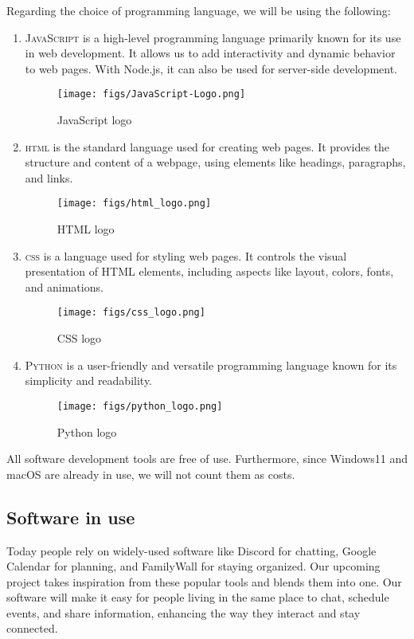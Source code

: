 \documentclass[conference]{IEEEtran}
\begin{document}
\vspace{12pt}
Regarding the choice of programming language, we will be using the following:
\begin{enumerate}
    \item \textsc{JavaScript} is a high-level programming language primarily known for its use in web development. It allows us to add interactivity and dynamic behavior to web pages. With Node.js, it can also be used for server-side development.
    \begin{figure}[H]
    \centering
    \texttt{[image: figs/JavaScript-Logo.png]}
    \caption{JavaScript logo}
    \label{fig:JavaScript logo}
    \end{figure}
    
    \item \textsc{html} is the standard language used for creating web pages. It provides the structure and content of a webpage, using elements like headings, paragraphs, and links.
    \begin{figure}[H]
    \centering
    \texttt{[image: figs/html\_logo.png]}
    \caption{HTML logo}
    \label{fig:HTML logo}
    \end{figure}
    
    \item \textsc{css} is a language used for styling web pages. It controls the visual presentation of HTML elements, including aspects like layout, colors, fonts, and animations.
    \begin{figure}[H]
    \centering
    \texttt{[image: figs/css\_logo.png]}
    \caption{CSS logo}
    \label{fig:CSS logo}
    \end{figure}
    
    \item \textsc{Python} is a user-friendly and versatile programming language known for its simplicity and readability.
    \begin{figure}[H]
    \centering
    \texttt{[image: figs/python\_logo.png]}
    \caption{Python logo}
    \label{fig:Python logo}
    \end{figure}
    
\end{enumerate}
All software development tools are free of use. Furthermore, since Windows11 and macOS are already in use, we will not count them as costs.

\subsection{Software in use}
Today people rely on widely-used software like Discord for chatting, Google Calendar for planning, and FamilyWall for staying organized. Our upcoming project takes inspiration from these popular tools and blends them into one. Our software will make it easy for people living in the same place to chat, schedule events, and share information, enhancing the way they interact and stay connected.
\end{document}
